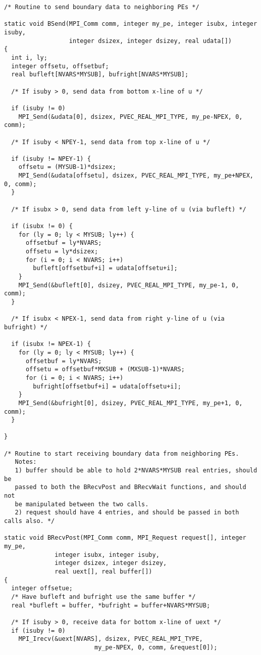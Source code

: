 \begin{verbatim}
/* Routine to send boundary data to neighboring PEs */

static void BSend(MPI_Comm comm, integer my_pe, integer isubx, integer isuby,
                  integer dsizex, integer dsizey, real udata[])
{
  int i, ly;
  integer offsetu, offsetbuf;
  real bufleft[NVARS*MYSUB], bufright[NVARS*MYSUB];

  /* If isuby > 0, send data from bottom x-line of u */

  if (isuby != 0)
    MPI_Send(&udata[0], dsizex, PVEC_REAL_MPI_TYPE, my_pe-NPEX, 0, comm);

  /* If isuby < NPEY-1, send data from top x-line of u */

  if (isuby != NPEY-1) {
    offsetu = (MYSUB-1)*dsizex;
    MPI_Send(&udata[offsetu], dsizex, PVEC_REAL_MPI_TYPE, my_pe+NPEX, 0, comm);
  }

  /* If isubx > 0, send data from left y-line of u (via bufleft) */

  if (isubx != 0) {
    for (ly = 0; ly < MYSUB; ly++) {
      offsetbuf = ly*NVARS;
      offsetu = ly*dsizex;
      for (i = 0; i < NVARS; i++)
        bufleft[offsetbuf+i] = udata[offsetu+i];
    }
    MPI_Send(&bufleft[0], dsizey, PVEC_REAL_MPI_TYPE, my_pe-1, 0, comm);   
  }

  /* If isubx < NPEX-1, send data from right y-line of u (via bufright) */

  if (isubx != NPEX-1) {
    for (ly = 0; ly < MYSUB; ly++) {
      offsetbuf = ly*NVARS;
      offsetu = offsetbuf*MXSUB + (MXSUB-1)*NVARS;
      for (i = 0; i < NVARS; i++)
        bufright[offsetbuf+i] = udata[offsetu+i];
    }
    MPI_Send(&bufright[0], dsizey, PVEC_REAL_MPI_TYPE, my_pe+1, 0, comm);   
  }

}
 
/* Routine to start receiving boundary data from neighboring PEs.
   Notes:
   1) buffer should be able to hold 2*NVARS*MYSUB real entries, should be
   passed to both the BRecvPost and BRecvWait functions, and should not
   be manipulated between the two calls.
   2) request should have 4 entries, and should be passed in both calls also. */

static void BRecvPost(MPI_Comm comm, MPI_Request request[], integer my_pe,
		      integer isubx, integer isuby,
		      integer dsizex, integer dsizey,
		      real uext[], real buffer[])
{
  integer offsetue;
  /* Have bufleft and bufright use the same buffer */
  real *bufleft = buffer, *bufright = buffer+NVARS*MYSUB;

  /* If isuby > 0, receive data for bottom x-line of uext */
  if (isuby != 0)
    MPI_Irecv(&uext[NVARS], dsizex, PVEC_REAL_MPI_TYPE,
    					 my_pe-NPEX, 0, comm, &request[0]);


\end{verbatim}
